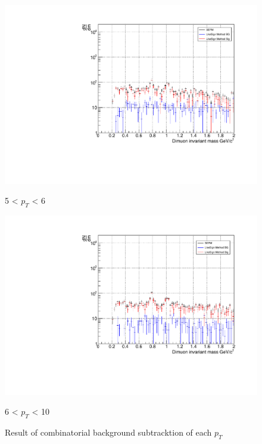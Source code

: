 \begin{figure}[H]
                    \vspace{1em}
                    \begin{minipage}{0.45\textwidth}
                        \centering
                        \includegraphics[width=\textwidth]{fig/3_4_1_CB_pt_5to6.pdf}
                        \caption*{5 < $p_{T}$ < 6}
                    \end{minipage}
                    \hfill
                    \begin{minipage}{0.45\textwidth}
                        \centering
                        \includegraphics[width=\textwidth]{fig/3_4_1_CB_pt_6to10.pdf}
                        \caption*{6 < $p_{T}$ < 10}
                    \end{minipage}
                    \caption{Result of combinatorial background subtracktion of each $p_T$}
                    \label{Analysis:Dimuon:CB:CB_pt_separation}
                \end{figure}


